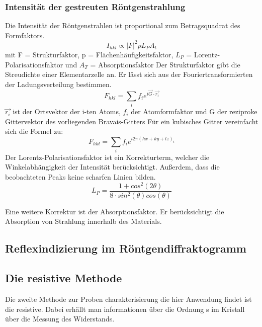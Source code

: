         \subsubsection{Intensität der gestreuten Röntgenstrahlung}
            Die Intensität der Röntgenstrahlen ist proportional zum Betragsquadrat des Formfaktors. 
            \begin{equation}
                I_{hkl} \propto |F|^2 p L_P A_t
            \end{equation}
            mit F = Strukturfaktor, p = Flächenhäufigkeitsfaktor, $L_P$ = Lorentz-Polarisationsfaktor und $A_T$ = Absorptionsfaktor
            Der Strukturfaktor gibt die Streudichte einer Elementarzelle an. Er lässt sich aus der Fouriertransformierten
            der Ladungsverteilung bestimmen.
            \begin{equation}
                F_{hkl} = \sum_i f_i e^{i \vec{G} \cdot \vec{r_i}}
            \end{equation}
            $\vec{r_i}$ ist der Ortsvektor der i-ten Atoms, $f_i$ der Atomformfaktor und G der reziproke Gittervektor des vorliegenden Bravais-Gitters
            Für ein kubisches Gitter vereinfacht sich  die Formel zu:
            \begin{equation}
                F_{hkl} = \sum_i f_i e^{i 2 \pi (hx + ky + lz)_i}
            \end{equation}
            Der Lorentz-Polarisationsfaktor ist ein Korrekturterm, welcher die Winkelabhängigkeit der Intensität berücksichtigt. Außerdem,
            dass die beobachteten Peaks keine scharfen Linien bilden.
            \begin{equation}
                L_P = \frac{1 + cos^2(2 \theta)}{8 \cdot sin^2(\theta) cos(\theta)}
            \end{equation}

            Eine weitere Korrektur ist der Absorptionsfaktor. Er berücksichtigt die Absorption von Strahlung innerhalb des Materials.
            
        \subsection{Reflexindizierung im Röntgendiffraktogramm}
        
    
    \subsection{Die resistive Methode}
        Die zweite Methode zur Proben charakterisierung die hier Anwendung findet ist die resistive.
        Dabei erhällt man informationen über die Ordnung s im Kristall über die Messung des Widerstands.
